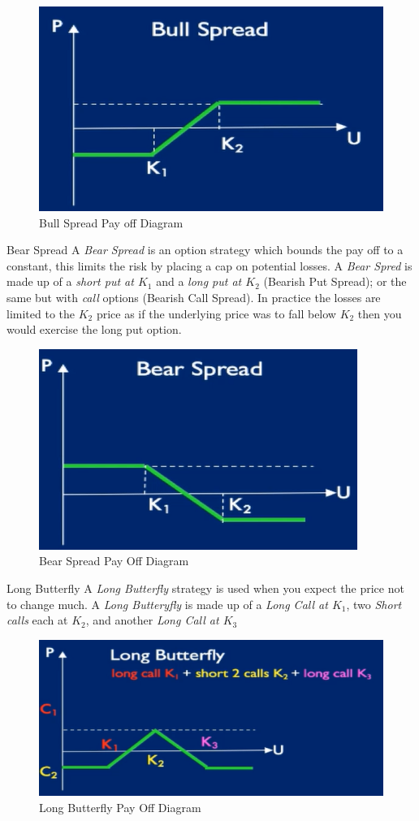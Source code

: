 \documentclass[11pt,a4paper]{article}
\begin{document}
\begin{figure}[ht!]
  \centering
  \includegraphics[width=.5\textwidth]{bullSpread.PNG}
  \caption{Bull Spread Pay off Diagram}
\end{figure}

\begin{definition}{Bear Spread}
  A \textit{Bear Spread} is an option strategy which bounds the pay off to a constant, this limits the risk by placing a cap on potential losses. A \textit{Bear Spred} is made up of a \textit{short put at $K_1$} and a \textit{long put at $K_2$} (Bearish Put Spread); or the same but with \textit{call} options (Bearish Call Spread). In practice the losses are limited to the $K_2$ price as if the underlying price was to fall below $K_2$ then you would exercise the long put option.
\end{definition}

\begin{figure}[ht!]
  \centering
  \includegraphics[width=.5\textwidth]{bearSpread.PNG}
  \caption{Bear Spread Pay Off Diagram}
\end{figure}

\begin{definition}{Long Butterfly}
  A \textit{Long Butterfly} strategy is used when you expect the price not to change much. A \textit{Long Butteryfly} is made up of a \textit{Long Call at $K_1$}, two \textit{Short calls} each at $K_2$, and another \textit{Long Call at $K_3$}
\end{definition}

\begin{figure}[ht!]
  \centering
  \includegraphics[width=.5\textwidth]{longButterfly.PNG}
  \caption{Long Butterfly Pay Off Diagram}
\end{figure}
\end{document}
